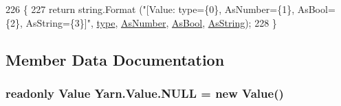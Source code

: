 \begin{DoxyCode}
226         \{
227             \textcolor{keywordflow}{return} string.Format (\textcolor{stringliteral}{"[Value: type=\{0\}, AsNumber=\{1\}, AsBool=\{2\}, AsString=\{3\}]"}, 
      \hyperlink{a00086_a6d5820fafa766911b9da84d1ed33e51a}{type}, \hyperlink{a00086_a751419743761562bf902246d6e6a3c0a}{AsNumber}, \hyperlink{a00086_a5805faef3b3d376090ff096d6dd6c064}{AsBool}, \hyperlink{a00086_a2d5d0ec41c50c642c1d0eeeb6bb2b1c0}{AsString});
228         \}
\end{DoxyCode}


\subsection{Member Data Documentation}
\hypertarget{a00086_a1ed2964965baca8621c45efa23f37660}{
\subsubsection[{N\-U\-L\-L}]{\setlength{\rightskip}{0pt plus 5cm}readonly {\bf Value} Yarn.\-Value.\-N\-U\-L\-L = new {\bf Value}()\hspace{0.3cm}{\ttfamily [static]}}}\label{a00086_a1ed2964965baca8621c45efa23f37660}


